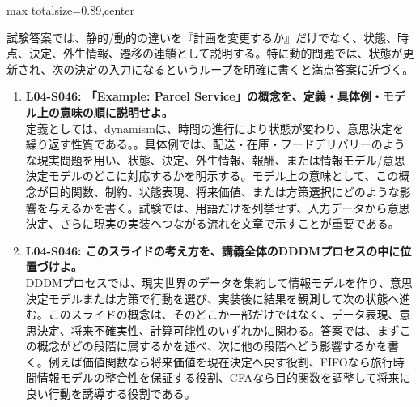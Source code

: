 \begin{minipage}[t]{0.58\textwidth}
\begin{adjustbox}{max totalsize={\textwidth}{0.89\textheight},center}
\begin{minipage}{\textwidth}
試験答案では、静的/動的の違いを『計画を変更するか』だけでなく、状態、時点、決定、外生情報、遷移の連鎖として説明する。特に動的問題では、状態が更新され、次の決定の入力になるというループを明確に書くと満点答案に近づく。\par{}\begin{enumerate}\item \textbf{L04-S046: 「Example: Parcel Service」の概念を、定義・具体例・モデル上の意味の順に説明せよ。}\\定義としては、dynamismは、時間の進行により状態が変わり、意思決定を繰り返す性質である。。具体例では、配送・在庫・フードデリバリーのような現実問題を用い、状態、決定、外生情報、報酬、または情報モデル/意思決定モデルのどこに対応するかを明示する。モデル上の意味として、この概念が目的関数、制約、状態表現、将来価値、または方策選択にどのような影響を与えるかを書く。試験では、用語だけを列挙せず、入力データから意思決定、さらに現実の実装へつながる流れを文章で示すことが重要である。\item \textbf{L04-S046: このスライドの考え方を、講義全体のDDDMプロセスの中に位置づけよ。}\\DDDMプロセスでは、現実世界のデータを集約して情報モデルを作り、意思決定モデルまたは方策で行動を選び、実装後に結果を観測して次の状態へ進む。このスライドの概念は、そのどこか一部だけではなく、データ表現、意思決定、将来不確実性、計算可能性のいずれかに関わる。答案では、まずこの概念がどの段階に属するかを述べ、次に他の段階へどう影響するかを書く。例えば価値関数なら将来価値を現在決定へ戻す役割、FIFOなら旅行時間情報モデルの整合性を保証する役割、CFAなら目的関数を調整して将来に良い行動を誘導する役割である。\end{enumerate}
\end{minipage}
\end{adjustbox}
\end{minipage}


